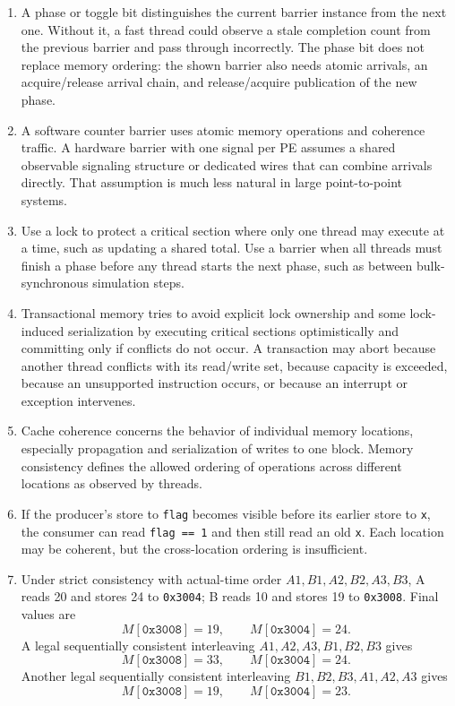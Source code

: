 \documentclass[11pt]{article}
\begin{document}
\begin{enumerate}
    \item A phase or toggle bit distinguishes the current barrier instance from the next one.
    Without it, a fast thread could observe a stale completion count from the previous barrier and pass through incorrectly.
    The phase bit does not replace memory ordering: the shown barrier also needs atomic arrivals, an acquire/release arrival chain, and release/acquire publication of the new phase.

    \item A software counter barrier uses atomic memory operations and coherence traffic.
    A hardware barrier with one signal per PE assumes a shared observable signaling structure or dedicated wires that can combine arrivals directly.
    That assumption is much less natural in large point-to-point systems.

    \item Use a lock to protect a critical section where only one thread may execute at a time, such as updating a shared total.
    Use a barrier when all threads must finish a phase before any thread starts the next phase, such as between bulk-synchronous simulation steps.

    \item Transactional memory tries to avoid explicit lock ownership and some lock-induced serialization by executing critical sections optimistically and committing only if conflicts do not occur.
    A transaction may abort because another thread conflicts with its read/write set, because capacity is exceeded, because an unsupported instruction occurs, or because an interrupt or exception intervenes.

    \item Cache coherence concerns the behavior of individual memory locations, especially propagation and serialization of writes to one block.
    Memory consistency defines the allowed ordering of operations across different locations as observed by threads.

    \item If the producer's store to \texttt{flag} becomes visible before its earlier store to \texttt{x}, the consumer can read \texttt{flag == 1} and then still read an old \texttt{x}.
    Each location may be coherent, but the cross-location ordering is insufficient.

    \item Under strict consistency with actual-time order \(A1,B1,A2,B2,A3,B3\), A reads 20 and stores 24 to \texttt{0x3004}; B reads 10 and stores 19 to \texttt{0x3008}.
    Final values are
    \[
        M[\texttt{0x3008}]=19,\qquad M[\texttt{0x3004}]=24.
    \]
    A legal sequentially consistent interleaving \(A1,A2,A3,B1,B2,B3\) gives
    \[
        M[\texttt{0x3008}]=33,\qquad M[\texttt{0x3004}]=24.
    \]
    Another legal sequentially consistent interleaving \(B1,B2,B3,A1,A2,A3\) gives
    \[
        M[\texttt{0x3008}]=19,\qquad M[\texttt{0x3004}]=23.
    \]


\end{enumerate}
\end{document}
